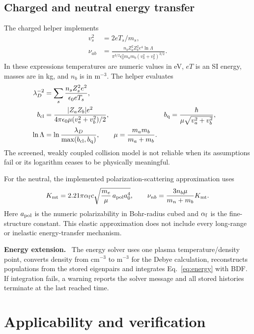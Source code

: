 \documentclass[11pt,a4paper]{article}
\newenvironment{caveat}[1][Caveat]{%
  \par\smallskip\noindent\begin{lrbox}{\notebox}\setlength{\fboxsep}{6pt}\begin{minipage}{\dimexpr\linewidth-2\fboxsep-2\fboxrule\relax}\small\textbf{#1.}\ }{%
  \end{minipage}\end{lrbox}\setlength{\fboxsep}{6pt}\fcolorbox{warnframe}{warnbg}{\usebox{\notebox}}\par\smallskip}
\numberwithin{equation}{section}
\begin{document}
\subsection{Charged and neutral energy transfer}

The charged helper implements
\begin{align}
 v_s^2&=2eT_s/m_s,\\
 \nu_{ab}&=\frac{n_b Z_a^2Z_b^2e^4\ln\Lambda}
 {\pi^{3/2}\epsilon_0^2m_am_b(v_a^2+v_b^2)^{3/2}}.
\end{align}
In these expressions temperatures are numeric values in eV, $eT$ is an SI
energy, masses are in kg, and $n_b$ is in m$^{-3}$. The helper evaluates
\begin{align}
 \lambda_D^{-2}&=\sum_s\frac{n_sZ_s^2e^2}{\epsilon_0 eT_s},\\
 b_{\rm cl}&=\frac{|Z_aZ_b|e^2}
 {4\pi\epsilon_0\mu(v_a^2+v_b^2)/2}, &
 b_{\rm q}&=\frac{\hbar}{\mu\sqrt{v_a^2+v_b^2}},\\
 \ln\Lambda&=\ln\frac{\lambda_D}{\max(b_{\rm cl},b_{\rm q})},
 \qquad \mu=\frac{m_am_b}{m_a+m_b}.
\end{align}
The screened, weakly coupled collision model is not reliable when its
assumptions fail or its logarithm ceases to be physically meaningful.

For the neutral, the implemented polarization-scattering approximation uses
\begin{equation}
 K_{\rm mt}=2.21\pi\alpha_{\rm f}c
     \sqrt{\frac{m_e}{\mu}\,a_{\rm pol}a_0^4},\qquad
 \nu_{nb}=\frac{3n_b\mu}{m_n+m_b}K_{\rm mt}.
\end{equation}
Here $a_{\rm pol}$ is the numeric polarizability in Bohr-radius cubed and
$\alpha_{\rm f}$ is the fine-structure constant. This elastic approximation
does not include every long-range or inelastic energy-transfer mechanism.

\begin{caveat}[Energy extension]
The energy solver uses one plasma temperature/density point,
converts density from cm$^{-3}$ to m$^{-3}$ for the Debye calculation,
reconstructs populations from the stored eigenpairs and integrates
Eq.~\eqref{eq:energy} with BDF. If integration fails, a warning
reports the solver message and all stored histories terminate at
the last reached time.
\end{caveat}

\section{Applicability and verification}\label{sec:limitations}
\end{document}
